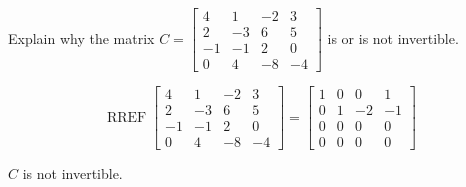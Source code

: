 
\begin{exerciseStatement}


Explain why the matrix \(C= \left[\begin{array}{cccc}
4 & 1 & -2 & 3 \\
2 & -3 & 6 & 5 \\
-1 & -1 & 2 & 0 \\
0 & 4 & -8 & -4
\end{array}\right] \) is or is not invertible.


\end{exerciseStatement}
    
\begin{exerciseAnswer} 


\[\operatorname{RREF} \left[\begin{array}{cccc}
4 & 1 & -2 & 3 \\
2 & -3 & 6 & 5 \\
-1 & -1 & 2 & 0 \\
0 & 4 & -8 & -4
\end{array}\right] = \left[\begin{array}{cccc}
1 & 0 & 0 & 1 \\
0 & 1 & -2 & -1 \\
0 & 0 & 0 & 0 \\
0 & 0 & 0 & 0
\end{array}\right] \]

\(C\) is not invertible.
\end{exerciseAnswer}
    
